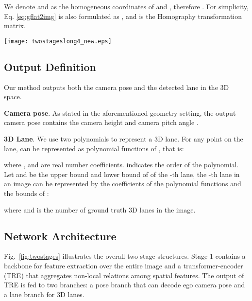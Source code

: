 \documentclass[letterpaper]{article} \usepackage{aaai22}  \usepackage{times}  \usepackage{helvet}  \usepackage{courier}  \usepackage[hyphens]{url}  \usepackage{graphicx} \urlstyle{rm} \def\UrlFont{\rm}  \usepackage{natbib}  \usepackage{caption}
\begin{document}
We denote  and  as the homogeneous  coordinates of  and , therefore . For simplicity, Eq. \ref{eq:gflat2img} is also formulated as , and  is the Homography transformation matrix. 


\begin{figure*}[t]
\begin{center}
\texttt{[image: twostageslong4\_new.eps]}
\end{center}
\caption{\textbf{System Overview.} Stage 1 learns camera pose with the help of an auxiliary lane branch and geometry constraints. Then, the estimated camera pose transforms image from perspective-view into top-view where lanes look similar. Finally, Stage 2 aims at predicting ultimate 3D lanes from distance-invariant top-view image accurately.}
\label{fig:twostages}
\end{figure*}

\subsection{Output Definition}
Our method outputs both the camera pose and the detected lane in the 3D space. 

\noindent \textbf{Camera pose}.
As stated in the aforementioned geometry setting, the output camera pose contains the camera height  and camera pitch angle .

\noindent \textbf{3D Lane}. We use two polynomials to represent a 3D lane. For any point  on the lane,  can be represented as polynomial functions of , that is:

where ,  and  are real number coefficients.  indicates the order of the polynomial. Let  and  be the upper bound and lower bound of  of the -th lane, the -th lane in an image can be represented by the coefficients of the polynomial functions and the bounds of :

where  and  is the number of ground truth 3D lanes in the image. 

\subsection{Network Architecture}

Fig.~\ref{fig:twostages} illustrates the overall two-stage structures. Stage 1 contains a backbone for feature extraction over the entire image and a transformer-encoder (TRE) that aggregates non-local relations among spatial features. The output of TRE is fed to two branches: a pose branch that can decode ego camera pose and a lane branch for 3D lanes.
\end{document}
